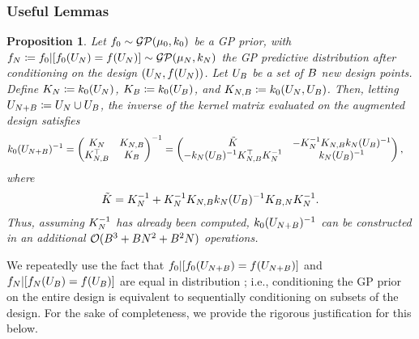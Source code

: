 \documentclass[12pt]{article}
\newtheorem{prop}{Proposition}
\begin{document}
\subsubsection{Useful Lemmas}

\begin{prop} \label{partitioned-matrix-inverse}
Let $\funcPrior \sim \GP(\gpMeanPrior, \gpKerPrior)$ be a GP prior, with 
$\funcEm[\Ndesign] \Def \funcPrior | [\funcPrior(\designIn) = \func(\designIn)] \sim \GP(\gpMean[\Ndesign], \gpKer[\Ndesign])$  
the GP predictive distribution after conditioning on the design $(\designIn, \func(\designIn))$. Let 
$\designBatchIn$ be a set of $\Nbatch$ new design points. Define 
$\kerMat[\Ndesign] \Def \gpKerPrior(\designIn)$, $\kerMat[\Nbatch] \Def \gpKerPrior(\designBatchIn)$,
and $\kerMat[\Ndesign,\Nbatch] \Def \gpKerPrior(\designIn[\Ndesign], \designBatchIn)$.  
Then, letting 
$\designIn[\Naugment] \Def \designIn \cup \designBatchIn$, the inverse of the kernel matrix 
evaluated on the augmented design satisfies 
\begin{align}
\gpKerPrior(\designIn[\Naugment])^{-1}
&= \begin{pmatrix} \kerMat[\Ndesign] & \kerMat[\Ndesign,\Nbatch] \\
\kerMat[\Ndesign,\Nbatch]^\top & \kerMat[\Nbatch] \end{pmatrix}^{-1}
=  \begin{pmatrix} \tilde{K} & -\kerMat[\Ndesign]^{-1} \kerMat[\Ndesign,\Nbatch] \gpKer[\Ndesign](\designBatchIn)^{-1} \\
-\gpKer[\Ndesign](\designBatchIn)^{-1} \kerMat[\Ndesign,\Nbatch]^\top  \kerMat[\Ndesign]^{-1} & \gpKer[\Ndesign](\designBatchIn)^{-1} \end{pmatrix},
\end{align}
where 
\begin{align}
\tilde{K} = \kerMat[\Ndesign]^{-1} + \kerMat[\Ndesign]^{-1} \kerMat[\Ndesign,\Nbatch] \gpKer[\Ndesign](\designBatchIn)^{-1} \kerMat[\Nbatch,\Ndesign] \kerMat[\Ndesign]^{-1}.
\end{align}
Thus, assuming $\kerMat[\Ndesign]^{-1}$ has already been computed, $\gpKerPrior(\designIn[\Naugment])^{-1}$ can be constructed in an additional 
$\BigO(\Nbatch^3 + \Nbatch \Ndesign^2 + \Nbatch^2 \Ndesign)$ operations. 
\end{prop}

We repeatedly use the fact that $\funcPrior|[\funcPrior(\designIn[\Naugment]) = \func(\designIn[\Naugment])]$ and 
$\funcEm[\Ndesign] | [\funcEm[\Ndesign](\designBatchIn) = \func(\designBatchIn)]$ are equal in distribution ; 
i.e., conditioning the GP prior on the entire design 
is equivalent to sequentially conditioning on subsets of the design. For the sake of completeness, we provide the rigorous justification for this below.
\end{document}
